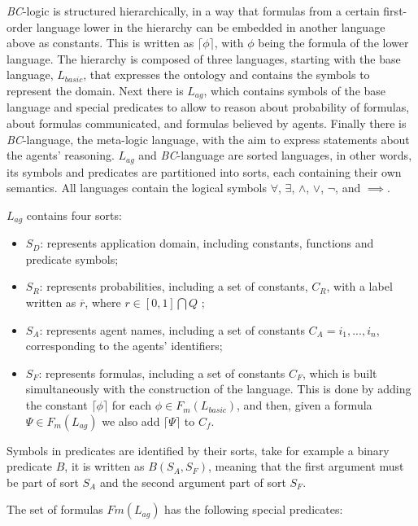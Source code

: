 \textit{BC}-logic is structured hierarchically, in a way that formulas from a certain first-order language lower in the hierarchy can be embedded in another language above as constants. This is written as $\lceil\phi\rceil$, with $\phi$ being the formula of the lower language.
The hierarchy is composed of three languages, starting with the base language, \textit{$L_{basic}$}, that expresses the ontology and contains the symbols to represent the domain. Next there is \textit{$L_{ag}$}, which contains symbols of the base language and special predicates to allow to reason about probability of formulas, about formulas communicated, and formulas believed by agents. Finally there is \textit{BC}-language, the meta-logic language, with the aim to express statements about the agents' reasoning. \textit{$L_{ag}$} and \textit{BC}-language are sorted languages, in other words, its symbols and predicates are partitioned into sorts, each containing their own semantics. All languages contain the logical symbols $\forall$, $\exists$, $\wedge$, $\vee$, $\neg$, and $\implies$.

\textit{$L_{ag}$} contains four sorts:
\begin{itemize}
	\item $S_D$: represents application domain, including constants, functions and predicate symbols;
	\item $S_R$: represents probabilities, including a set of constants, $C_R$, with a label written as $\overline{r}$, where $r \in [0,1]\bigcap Q$ ;
	\item $S_A$: represents agent names, including a set of constants $C_A = {i_1, ..., i_n}$, corresponding to the agents' identifiers;
	\item $S_F$: represents formulas, including a set of constants $C_F$, which is built simultaneously with the construction of the language. This is done by adding the constant $\lceil\phi\rceil$ for each $\phi \in F_m(L_{basic})$, and then, given a formula $\Psi \in F_m(L_{ag})$ we also add $\lceil\Psi\rceil$ to $C_f$.
\end{itemize}

Symbols in predicates are identified by their sorts, take for example a binary predicate $B$, it is written as $B(S_A, S_F)$, meaning that the first argument must be part of sort $S_A$ and the second argument part of sort $S_F$.

The set of formulas $Fm(L_{ag})$ has the following special predicates:


